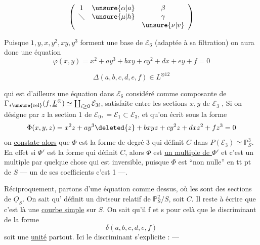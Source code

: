 \[
\left(\begin{array}{ccc}
1&\unsure{\alpha|a}&\beta\\
\diagdown&\unsure{\mu|h}&\gamma\\
&&\unsure{\nu|v}
\end{array}\right)
\]

 Puisque $1,y,x,y^2,xy,y^3$ forment une base de $\mathcal E_6$ (adaptée à sa filtration) on aura donc une équation
\[
\varphi(x,y)=\boxed{x^2+ay^3+bxy+cy^2+dx+ey+f=0}
\]

\[
\Delta(a,b,c,d,e,f)\in L^{\otimes12}
\]

qui est d'ailleurs une équation  dans $\mathcal E_6$ considéré comme composante de $\Gamma_{*\mathrm{\unsure{rel}}}(f,\underline L^{\otimes})\simeq\coprod_{i\geq0}\mathcal E_{3i}$, satisfaite entre les sections $x,y$ de $\mathcal E_3$ ,   Si on désigne par $z$ la section $1$ de $\mathcal E_0,=\mathcal E_1\subset\mathcal E_3$, et qu'on  écrit  sous la forme
\[
\Phi(x,y,z)=x^2z+ay^3\deleted{z}+bxyz+cy^2z+dxz^2+fz^3=0
\]
on \uline{constate alors} que $\Phi$ est la forme de degré 3 qui définit  $C$ dans $P(\mathcal E_3)\simeq\mathbb P^3_S$. En effet si $\Phi'$ est la forme qui définit $C$, alors $\Phi$ est \uline{un multiple de $\Phi'$} et  c'est un multiple par quelque chose qui est inversible, puisque $\Phi$ est ``non nulle'' en tt pt de $S$ --- un de ses coefficients c'est 1 ---.

Réciproquement, partons d'une équation comme dessus, où les   sont des sections de $\underline O_S$. On sait qu'  définit un diviseur relatif  de $\mathbb P^2_S/S$, soit $C$. Il reste à écrire que c'est là une \uline{courbe simple} sur $S$. On sait qu'il f et s pour celà que le discriminant de la forme
\[
\delta(a,b,c,d,e,f)
\]
soit une \uline{unité} partout. Ici le discriminant s'explicite : ---

